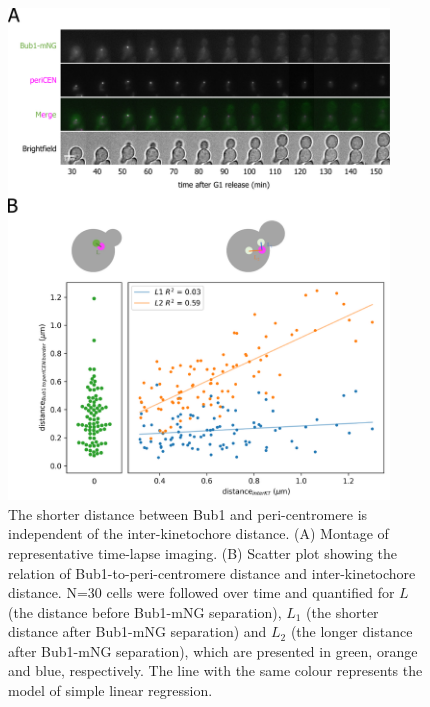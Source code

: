 \begin{figure}[htbp]
  \centering
  \includegraphics[width=0.9\textwidth]{figures/Bub1-mNG peri-cen.pdf}
  \caption[The shorter distance between Bub1 and peri-centromere is independent of the inter-kinetochore distance]{The shorter distance between Bub1 and peri-centromere is independent of the inter-kinetochore distance. (A) Montage of representative time-lapse imaging. (B) Scatter plot showing the relation of Bub1-to-peri-centromere distance and inter-kinetochore distance. N=30 cells were followed over time and quantified for $L$ (the distance before Bub1-mNG separation), $L_{1}$ (the shorter distance after Bub1-mNG separation) and $L_{2}$ (the longer distance after Bub1-mNG separation), which are presented in green, orange and blue, respectively. The line with the same colour represents the model of simple linear regression. }
  \label{fig:periCEN}
\end{figure} 


